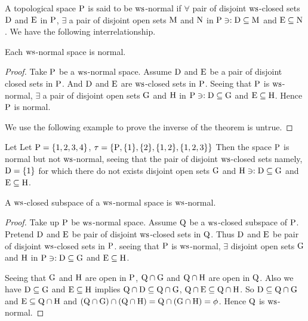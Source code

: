 \begin{dfn}\label{defi8.4.1}
A topological space $\mathrm{P}$ is said to be $\mathrm{ws}$-normal if $\forall$ pair of disjoint $\mathrm{ws}$-closed sets $\mathrm{D}$ and $\mathrm{E}$ in $\mathrm{P}$, $\exists$ a pair of disjoint open sets $\mathrm{M}$ and $\mathrm{N}$ in $\mathrm{P} \ni: \mathrm{D} \subseteq \mathrm{M}$ and $\mathrm{E} \subseteq \mathrm{N}$. We have the following interrelationship.
\end{dfn}

\begin{thm}\label{thm8.4.2}
Each $\mathrm{ws}$-normal space is normal.
\end{thm}

\begin{proof}
Take $\mathrm{P}$ be a $\mathrm{ws}$-normal space. Assume $\mathrm{D}$ and $\mathrm{E}$ be a pair of disjoint closed sets in $\mathrm{P}$. And $\mathrm{D}$ and $\mathrm{E}$ are $\mathrm{ws}$-closed sets in $\mathrm{P}$. Seeing that $\mathrm{P}$ is $\mathrm{ws}$-normal, $\exists$ a pair of disjoint open sets $\mathrm{G}$ and $\mathrm{H}$ in $\mathrm{P} \ni: \mathrm{D} \subseteq \mathrm{G}$ and $\mathrm{E} \subseteq \mathrm{H}$. Hence $\mathrm{P}$ is normal. 

We use the following example to prove the inverse of the theorem is untrue.
\end{proof}

\begin{exm}\label{exam8.4.4}
Let Let $\mathrm{P}=\{1,2,3,4\}$, $\tau= \{\mathrm{P}, \{1\},\{2\},\{1,2\},\{1,2,3\}\}$ Then the space $\mathrm{P}$ is normal but not $\mathrm{ws}$-normal, seeing that the pair of disjoint $\mathrm{ws}$-closed sets namely, $\mathrm{D} =\{1\}$ for which there do not exists disjoint open sets $\mathrm{G}$ and $\mathrm{H} \ni: \mathrm{D} \subseteq \mathrm{G}$ and $\mathrm{E} \subseteq \mathrm{H}$.
\end{exm}

\begin{thm}\label{thm8.4.5}
A $\mathrm{ws}$-closed subspace of a $\mathrm{ws}$-normal space is $\mathrm{ws}$-normal.
\end{thm}

\begin{proof}
Take up $\mathrm{P}$ be $\mathrm{ws}$-normal space. Assume $\mathrm{Q}$ be a $\mathrm{ws}$-closed subspace of $\mathrm{P}$. Pretend $\mathrm{D}$ and $\mathrm{E}$ be pair of disjoint $\mathrm{ws}$-closed sets in $\mathrm{Q}$. Thus $\mathrm{D}$ and $\mathrm{E}$ be pair of disjoint $\mathrm{ws}$-closed sets in $\mathrm{P}$. seeing that $\mathrm{P}$ is $\mathrm{ws}$-normal, $\exists$ disjoint open sets $\mathrm{G}$ and $\mathrm{H}$ in $\mathrm{P} \ni: \mathrm{D} \subseteq \mathrm{G}$ and $\mathrm{E} \subseteq \mathrm{H}$. 

Seeing that $\mathrm{G}$ and $\mathrm{H}$ are open in $\mathrm{P}$, $\mathrm{Q} \cap \mathrm{G}$ and $\mathrm{Q} \cap \mathrm{H}$ are open in $\mathrm{Q}$. Also we have $\mathrm{D} \subseteq \mathrm{G}$ and $\mathrm{E} \subseteq \mathrm{H}$ implies $\mathrm{Q} \cap \mathrm{D} \subseteq \mathrm{Q} \cap \mathrm{G}$, $\mathrm{Q} \cap \mathrm{E} \subseteq \mathrm{Q} \cap \mathrm{H}$. So $\mathrm{D} \subseteq \mathrm{Q} \cap \mathrm{G}$ and $\mathrm{E} \subseteq \mathrm{Q} \cap \mathrm{H}$ and $(\mathrm{Q} \cap \mathrm{G})\cap (\mathrm{Q} \cap \mathrm{H}) = \mathrm{Q} \cap (\mathrm{G}\cap \mathrm{H}) = \phi$. Hence $\mathrm{Q}$ is $\mathrm{ws}$-normal.
\end{proof}

